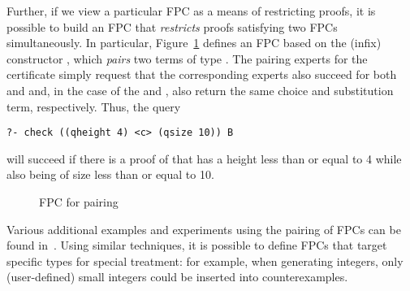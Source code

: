 % 
% 

Further, if we view a particular FPC as a means of restricting proofs, it is
possible to build an FPC that \emph{restricts} proofs satisfying two FPCs
simultaneously.
%
In particular, Figure~\ref{fig:pairing} defines an FPC based on the
(infix) constructor , which \emph{pairs} two terms of type
.
%
The pairing experts for the certificate  simply
request that the corresponding experts also succeed for both
 and  and, in the case of the  and
, also return the same choice and substitution term,
respectively.
%
Thus, the query 
\begin{lstlisting}
?- check ((qheight 4) <c> (qsize 10)) B
\end{lstlisting}
will succeed if there is a proof of  that has a height less
than or equal to 4 while also being of size less than or equal to 10.
%


\begin{figure}


\caption{FPC for pairing}
\label{fig:pairing}
\end{figure}

Various  additional examples and experiments using the pairing of FPCs
can be found in~\cite{Pair}. Using similar techniques, it is possible to define FPCs that target
specific types for special treatment: for example, when generating
integers, only (user-defined) small integers could be inserted into
counterexamples.


